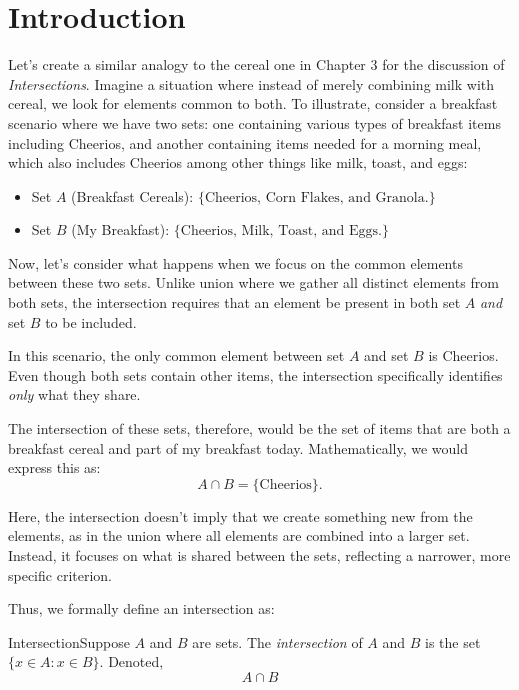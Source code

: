 \renewcommand{\theenumi}{\arabic{enumi}}
\renewcommand{\labelenumi}{\theenumi.}
\section{Introduction}

Let's create a similar analogy to the cereal one in Chapter 3 for the discussion of \textit{Intersections}. Imagine a situation where instead of merely combining milk with cereal, we look for elements common to both. To illustrate, consider a breakfast scenario where we have two sets: one containing various types of breakfast items including Cheerios, and another containing items needed for a morning meal, which also includes Cheerios among other things like milk, toast, and eggs:

\begin{itemize}
    \item Set $A$ (Breakfast Cereals): $\{\text{Cheerios, Corn Flakes, and Granola.}\}$
    \item Set $B$ (My Breakfast): $\{\text{Cheerios, Milk, Toast, and Eggs.}\}$
\end{itemize}

Now, let’s consider what happens when we focus on the common elements between these two sets. Unlike union where we gather all distinct elements from both sets, the intersection requires that an element be present in both set $A$ \textit{and} set $B$ to be included.

In this scenario, the only common element between set $A$ and set $B$ is Cheerios. Even though both sets contain other items, the intersection specifically identifies \textit{only} what they share.

The intersection of these sets, therefore, would be the set of items that are both a breakfast cereal and part of my breakfast today. Mathematically, we would express this as: $$A \cap B = \{\text{Cheerios}\}.$$

Here, the intersection doesn't imply that we create something new from the elements, as in the union where all elements are combined into a larger set. Instead, it focuses on what is shared between the sets, reflecting a narrower, more specific criterion.

Thus, we formally define an intersection as: 
\begin{definition}
    {Intersection}Suppose $A$ and $B$ are sets. The \textit{intersection} of $A$ and $B$ is the set $\{x \in A \colon x \in B\}$. Denoted, $$A\cap B$$
\end{definition}

